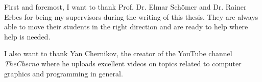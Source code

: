 %
\label{sec:acknowledgement}

First and foremost, I want to thank Prof. Dr. Elmar Schömer and Dr. Rainer Erbes for being my supervisors during the writing of this thesis. They are always able to move their students in the right direction and are ready to help where help is needed.

I also want to thank Yan Chernikov, the creator of the YouTube channel \textit{TheCherno} where he uploads excellent videos on topics related to computer graphics and programming in general.
